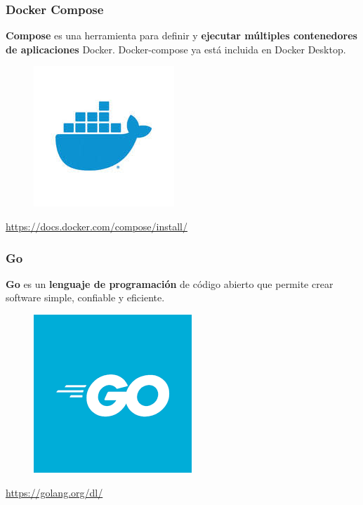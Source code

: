 \documentclass{beamer}
\begin{document}
	\begin{frame}
		\frametitle{Docker Compose}
		\textbf{Compose} es una herramienta para definir y \textbf{ejecutar múltiples contenedores de aplicaciones} Docker. Docker-compose ya está incluida en Docker Desktop.
		\begin{figure}[h]
			\includegraphics[scale=.3]{docker}
			\centering
		\end{figure}
		\begin{center}
			\tiny{\url{https://docs.docker.com/compose/install/}}
		\end{center}
	\end{frame}

	\begin{frame}
		\frametitle{Go}
		\textbf{Go} es un \textbf{lenguaje de programación} de código abierto que permite crear software simple, confiable y eficiente.
		\begin{figure}[h]
			\includegraphics[scale=.3]{go}
			\centering
		\end{figure}
		\begin{center}
			\tiny{\url{https://golang.org/dl/}}
		\end{center}
	\end{frame}
	
\end{document}
